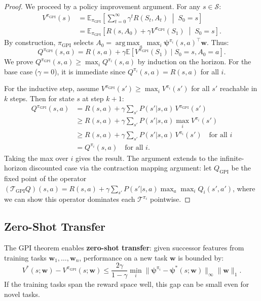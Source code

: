 \documentclass[11pt,a4paper]{article}
\newcommand{\E}{\mathbb{E}}
\newcommand{\cS}{\mathcal{S}}
\newcommand{\cT}{\mathcal{T}}
\DeclareMathOperator*{\argmax}{arg\,max}
\begin{document}
\begin{proof}
We proceed by a policy improvement argument. For any $s \in \cS$:
\begin{align*}
  V^{\pi_{\mathrm{GPI}}}(s)
  &= \E_{\pi_{\mathrm{GPI}}}\!\left[\sum_{t=0}^\infty \gamma^t R(S_t, A_t) \;\middle|\; S_0 = s \right] \\
  &= \E_{\pi_{\mathrm{GPI}}}\!\left[R(s, A_0) + \gamma V^{\pi_{\mathrm{GPI}}}(S_1) \;\middle|\; S_0 = s\right].
\end{align*}
By construction, $\pi_{\mathrm{GPI}}$ selects $A_0 = \argmax_a \max_i \boldsymbol{\psi}^{\pi_i}(s,a)^\top \mathbf{w}$. Thus:
\[
  Q^{\pi_{\mathrm{GPI}}}(s, a) = R(s,a) + \gamma \E[V^{\pi_{\mathrm{GPI}}}(S_1) \mid S_0 = s, A_0 = a].
\]
We prove $Q^{\pi_{\mathrm{GPI}}}(s,a) \geq \max_i Q^{\pi_i}(s,a)$ by induction on the horizon.
For the base case ($\gamma = 0$), it is immediate since $Q^{\pi_i}(s,a) = R(s,a)$ for all $i$.

For the inductive step, assume $V^{\pi_{\mathrm{GPI}}}(s') \geq \max_i V^{\pi_i}(s')$ for
all $s'$ reachable in $k$ steps. Then for state $s$ at step $k+1$:
\begin{align*}
  Q^{\pi_{\mathrm{GPI}}}(s, a)
  &= R(s,a) + \gamma \sum_{s'} P(s'|s,a)\, V^{\pi_{\mathrm{GPI}}}(s') \\
  &\geq R(s,a) + \gamma \sum_{s'} P(s'|s,a) \max_i V^{\pi_i}(s') \\
  &\geq R(s,a) + \gamma \sum_{s'} P(s'|s,a)\, V^{\pi_i}(s') \quad \text{for all } i \\
  &= Q^{\pi_i}(s,a) \quad \text{for all } i.
\end{align*}
Taking the max over $i$ gives the result. The argument extends to the infinite-horizon
discounted case via the contraction mapping argument: let $Q_{\mathrm{GPI}}$ be the fixed
point of the operator $(\cT_{\mathrm{GPI}} Q)(s,a) = R(s,a) + \gamma \sum_{s'} P(s'|s,a) \max_a \max_i Q_i(s',a')$,
where we can show this operator dominates each $\cT^{\pi_i}$ pointwise.
\end{proof}

\subsection{Zero-Shot Transfer}

The GPI theorem enables \textbf{zero-shot transfer}: given successor features from
training tasks $\mathbf{w}_1, \ldots, \mathbf{w}_n$, performance on a new task $\mathbf{w}$ is bounded by:
\[
  V^*(s; \mathbf{w}) - V^{\pi_{\mathrm{GPI}}}(s; \mathbf{w}) \leq \frac{2\gamma}{1 - \gamma}
  \min_{i} \|\boldsymbol{\psi}^{\pi_i} - \boldsymbol{\psi}^*(s; \mathbf{w})\|_\infty \|\mathbf{w}\|_1.
\]
If the training tasks span the reward space well, this gap can be small even
for novel tasks.
\end{document}
